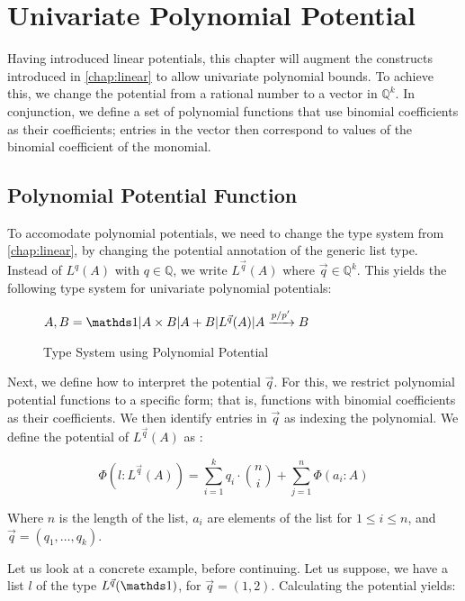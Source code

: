 \chapter{Univariate Polynomial Potential} \label{chap:univariate-polynomial}

Having introduced linear potentials, this chapter will augment the constructs introduced in \ref{chap:linear} to allow univariate polynomial bounds. To achieve this, we change the potential from a rational number to a vector in $\mathbb{Q}^k$. In conjunction, we define a set of polynomial functions that use binomial coefficients as their coefficients; entries in the vector then correspond to values of the binomial coefficient of the monomial. 

\section{Polynomial Potential Function}

To accomodate polynomial potentials, we need to change the type system from \ref{chap:linear}, by changing the potential annotation of the generic list type. Instead of \(L^q(A)\) with \(q \in \mathbb{Q}\), we write $L^{\vec{q}}(A)$ where $\vec{q} \in \mathbb{Q}^k$. 
This yields the following type system for univariate polynomial potentials:

\begin{figure}[H]
\centering
\(A,B = \unit | A \times B | A + B | L^{\vec{q}}(A) | A \xrightarrow{p/p'} B\)
\caption{Type System using Polynomial Potential}
\label{fig:polynomial-type-system}
\end{figure}

Next, we define how to interpret the potential $\vec{q}$. For this, we restrict polynomial potential functions to a specific form; that is, functions with binomial coefficients as their coefficients. We then identify entries in $\vec{q}$ as indexing the polynomial. 
We define the potential of $L^{\vec{q}}(A)$ as :

\[
   \Phi(l: L^{\vec{q}}(A)) = \displaystyle\sum_{i = 1}^{k} q_i \cdot \binom{n}{i} + \displaystyle\sum_{j = 1}^{n} \Phi(a_i : A)
\]

Where $n$ is the length of the list, $a_i$ are elements of the list for $1 \leq i \leq n$, and $\vec{q} = (q_1, \dots, q_k)$.

Let us look at a concrete example, before continuing. Let us suppose, we have a list $l$ of the type $L^{\vec{q}}(\unit)$, for $\vec{q} = (1, 2)$. Calculating the potential yields: 

